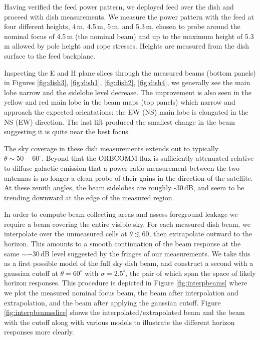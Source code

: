 \documentclass[preprint]{aastex}
\begin{document}
Having verified the feed power pattern, we deployed feed over the dish and proceed with dish measurements. We measure the power pattern with the feed at four different heights, 4\,m, 4.5\,m, 5\,m, and 5.3\,m, chosen to probe around the nominal focus of 4.5\,m (the nominal beam) and up to the maximum height of 5.3\,m allowed by pole height and rope stresses. Heights are measured from the dish surface to the feed backplane. 

Inspecting the E and H plane slices through the measured beams (bottom panels) in Figures \ref{fig:dish3}, \ref{fig:dish1}, \ref{fig:dish2}, \ref{fig:dish4}, we generally see the main lobe narrow and the sidelobe level decrease. The improvement is also seen in the yellow and red main lobe in the beam maps (top panels) which narrow and approach the expected orientations: the EW (NS) main lobe is elongated in the NS (EW) direction. The last lift produced the smallest change in the beam suggesting it is quite near the best focus. 

The sky coverage in these dish measurements extends out to typically $\theta\sim50-60^\circ$. Beyond that the ORBCOMM flux is sufficiently attenuated relative to diffuse galactic emission that a power ratio measurement between the two antennas is no longer a clean probe of their gains in the direction of the satellite. At these zenith angles, the beam sidelobes are roughly -30\,dB, and seem to be trending downward at the edge of the measured region.

In order to compute beam collecting areas and assess foreground leakage we require a beam covering the entire visible sky. For each measured dish beam, we interpolate over the unmeasured cells at $\theta\lesssim60$, then extrapolate outward to the horizon. This amounts to a smooth continuation of the beam response at the same $\sim-30$\,dB level suggested by the fringes of our measurements. We take this as a first possible model of the full sky dish beam, and construct a second with a gaussian cutoff at $\theta=60^\circ$ with $\sigma=2.5^\circ$, the pair of which span the space of likely horizon responses. This procedure is depicted in Figure \ref{fig:interpbeams} where we plot the measured nominal focus beam, the beam after interpolation and extrapolation, and the beam after applying the gaussian cutoff. Figure \ref{fig:interpbeamsslice} shows the interpolated/extrapolated beam and the beam with the cutoff along with various models to illustrate the different horizon responses more clearly.

\end{document}

